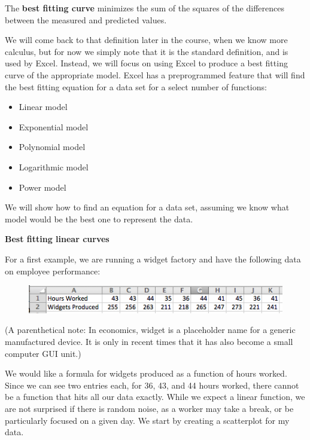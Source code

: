 \documentclass[10pt,]{book}
\newcommand{\terminology}[1]{\textbf{#1}}
\theoremstyle{plain}
\theoremstyle{definition}
\newenvironment{assemblage-untitled}{\mdfsetup{%
roundcorner=2ex, backgroundcolor=blue!5,linecolor=blue!75!black,}%
\begin{mdframed}}{\end{mdframed}}
\theoremstyle{definition}
\begin{document}
%
\begin{assemblage-untitled}\label{assemblage-10}
The \terminology{best fitting curve} minimizes the sum of the squares of the differences between the measured and predicted values. 
%
\end{assemblage-untitled}
\par
We will come back to that definition later in the course, when we know more calculus, but for now we simply note that it is the standard definition, and is used by Excel.  Instead, we will focus on using Excel to produce a best fitting curve of the appropriate model. Excel has a preprogrammed feature that will find the best fitting equation for a data set for a select number of functions:%
\leavevmode%
\begin{itemize}[label=\textbullet]
\item{}Linear model%
\item{}Exponential model%
\item{}Polynomial model%
\item{}Logarithmic model%
\item{}Power model%
\end{itemize}
\par
We will show how to find an equation for a data set, assuming we know what model would be the best one to represent the data.

%
\par
\terminology{Best fitting linear curves}

%
\par
For a first example, we are running a widget factory and have the following data on employee performance:

  \leavevmode%
\begin{figure}
\centering
\includegraphics[width=0.8\linewidth]{images/sec1-5-1.png}
\end{figure}
 

%
\par
(A parenthetical note:  In economics, widget is a placeholder name for a generic manufactured device.  It is only in recent times that it has also become a small computer GUI unit.)
%
\par
We would like a formula for widgets produced as a function of hours worked.  Since we can see two entries each, for 36, 43, and 44 hours worked, there cannot be a function that hits all our data exactly.  While we expect a linear function, we are not surprised if there is random noise, as a worker may take a break, or be particularly focused on a given day.  We start by creating a scatterplot for my data.
\end{document}
